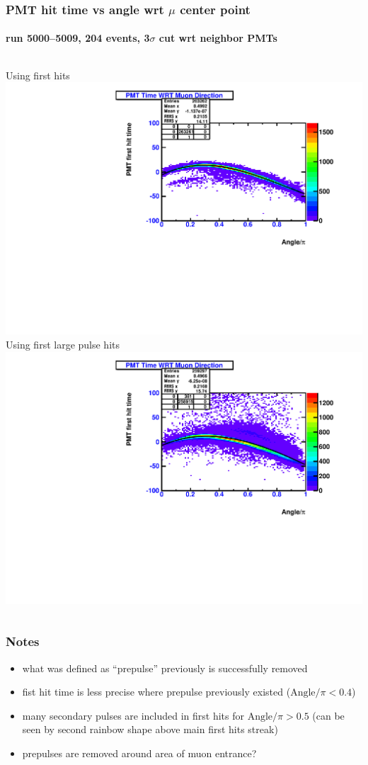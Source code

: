 \documentclass{beamer}
\begin{document}
\begin{frame}
	\frametitle{PMT hit time vs angle wrt $\mu$ center point}
	\framesubtitle{run \numrange{5000}{5009}, 204 events, 3$\sigma$ cut wrt
neighbor PMTs}
	\begin{columns}[t]
		Using first hits
		\includegraphics[width=1.0\textwidth]{analyzed_rtq_atm_mu_run005000_test_hitTimePositions.pdf}
		Using first large pulse hits
		\includegraphics[width=1.0\textwidth]{analyzed_rtq_atm_mu_run005000_multiPulse_test_hitTimePositions.pdf}
	\end{columns}
\end{frame}

\begin{frame}
	\frametitle{Notes}
	
	\begin{itemize}
		\item what was defined as ``prepulse'' previously is successfully
			removed
		\item fist hit time is less precise where prepulse previously existed
			($\text{Angle}/\pi < 0.4$)
		\item many secondary pulses are included in first hits for
			$\text{Angle}/\pi > 0.5$
			(can be seen by second rainbow shape above main first hits streak)
		\item prepulses are removed around area of muon entrance?
	\end{itemize}
\end{frame}
\end{document}
